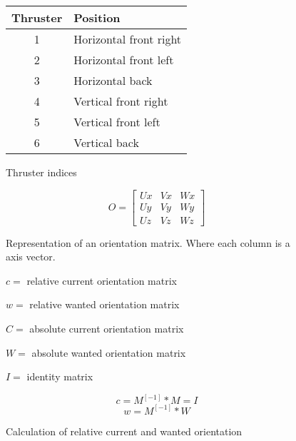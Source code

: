 \begin{figure}
	\begin{center}
		\begin{tabular}{c l}
			Thruster & Position \\
			\hline		
			1 & Horizontal front right \\
			2 & Horizontal front left \\
			3 & Horizontal back \\
			4 & Vertical front right \\
			5 & Vertical front left \\
			6 & Vertical back
		\end{tabular}
	\caption{Thruster indices}
	\label{fig:THRUSTERINDICES}
	 \end{center}
 \end{figure}

\begin{figure}
	\begin{center}
		\[ O = 
		\begin{bmatrix}
			Ux & Vx & Wx \\
			Uy & Vy & Wy \\
			Uz & Vz & Wz 
		\end{bmatrix} \]
		\caption{Representation of an orientation matrix. Where each column is a axis vector.}
		\label{fig:ORIENTATIONMATRIX}
	\end{center}
\end{figure}

\begin{figure}
	\begin{center}
			$c =$ relative current orientation matrix

			$w =$ relative wanted orientation matrix 

			$C =$ absolute current orientation matrix 

			$W =$ absolute wanted orientation matrix 

			$I =$ identity matrix 

		\begin{equation}
			c = M^[-1] * M = I
		\end{equation}
		\begin{equation}
			w = M^[-1] * W
		\end{equation}

		\caption{Calculation of relative current and wanted orientation}
		\label{fig:RELATIVEROTATIONCALCULATION}
	\end{center}
\end{figure}

		 